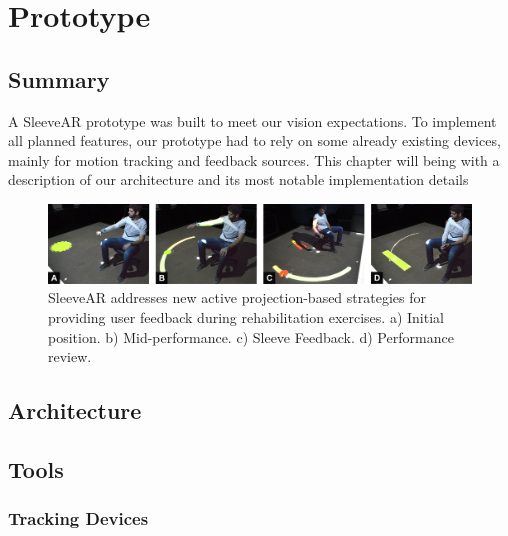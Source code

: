 \chapter{Prototype}
\label{sec:implementation}

\section*{Summary}
A SleeveAR prototype was built to meet our vision expectations. To implement all planned features, our prototype had to rely on some already existing devices, mainly for motion tracking and feedback sources. This chapter will being with a description of our architecture and its most notable implementation details




\begin{figure}[!t]
    \begin{center}
        \includegraphics[width=\textwidth]{imgs/impl/teaser.jpg}
    \end{center}
    \caption{SleeveAR addresses new active projection-based strategies for providing user feedback during rehabilitation exercises. a) Initial position. b) Mid-performance. c) Sleeve Feedback. d) Performance review.}
    \label{fig:sleevewearable}
\end{figure}

\section{Architecture}
\label{sec:impl:arch}



\section{Tools}
\label{sec:impl:tools}

\subsection{Tracking Devices}


